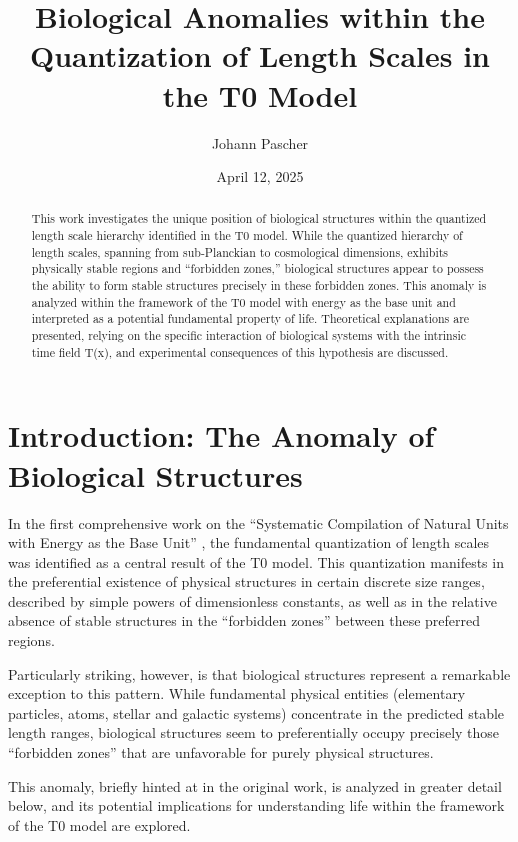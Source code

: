 \documentclass[12pt,a4paper]{article}
\title{Biological Anomalies within the\\Quantization of Length Scales in the T0 Model}
\author{Johann Pascher}
\date{April 12, 2025}
\newcommand{\Tfield}{T(x)}
\begin{document}
	
	\maketitle
	
	\begin{abstract}
		This work investigates the unique position of biological structures within the quantized length scale hierarchy identified in the T0 model. While the quantized hierarchy of length scales, spanning from sub-Planckian to cosmological dimensions, exhibits physically stable regions and ``forbidden zones,'' biological structures appear to possess the ability to form stable structures precisely in these forbidden zones. This anomaly is analyzed within the framework of the T0 model with energy as the base unit and interpreted as a potential fundamental property of life. Theoretical explanations are presented, relying on the specific interaction of biological systems with the intrinsic time field \Tfield, and experimental consequences of this hypothesis are discussed.
	\end{abstract}
	
	\section{Introduction: The Anomaly of Biological Structures}
	
	In the first comprehensive work on the ``Systematic Compilation of Natural Units with Energy as the Base Unit'' \cite{pascher_nateinheiten_2025}, the fundamental quantization of length scales was identified as a central result of the T0 model. This quantization manifests in the preferential existence of physical structures in certain discrete size ranges, described by simple powers of dimensionless constants, as well as in the relative absence of stable structures in the ``forbidden zones'' between these preferred regions.
	
	Particularly striking, however, is that biological structures represent a remarkable exception to this pattern. While fundamental physical entities (elementary particles, atoms, stellar and galactic systems) concentrate in the predicted stable length ranges, biological structures seem to preferentially occupy precisely those ``forbidden zones'' that are unfavorable for purely physical structures.
	
	This anomaly, briefly hinted at in the original work, is analyzed in greater detail below, and its potential implications for understanding life within the framework of the T0 model are explored.
	
\end{document}
